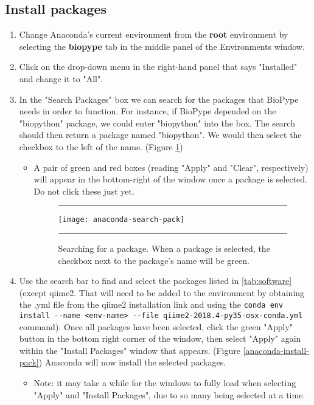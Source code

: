 \subsection*{Install packages}
    \begin{enumerate}
        \item Change Anaconda's current environment from the \textbf{root} environment by selecting the \textbf{biopype} tab in the middle panel of the Environments window.
        \item Click on the drop-down menu in the right-hand panel that says "Installed" and change it to "All".
        \item In the "Search Packages" box we can search for the packages that BioPype needs in order to function. For instance, if BioPype depended on the "biopython" package, we could enter "biopython" into the box. The search should then return a package named "biopython". We would then select the checkbox to the left of the name. (Figure \ref{anaconda-search-pack})
        \begin{itemize}
            \item A pair of green and red boxes (reading "Apply" and "Clear", respectively) will appear in the bottom-right of the window once a package is selected. Do not click these just yet. 

\begin{figure}[hbtp]
    \begin{maxipage}
    \hrule
    \centering
    \texttt{[image: anaconda-search-pack]}
    \caption{Searching for a package. When a package is selected, the checkbox next to the package's name will be green.}
    \label{anaconda-search-pack}
    \hrule
    \end{maxipage}
\end{figure}
        \end{itemize}
        \item Use the search bar to find and select the packages listed in \autoref{tab:software} (except qiime2. That will need to be added to the environment by obtaining the .yml file from the qiime2 installation link and using the \verb|conda env install --name <env-name> --file qiime2-2018.4-py35-osx-conda.yml| command). Once all packages have been selected, click the green "Apply" button in the bottom right corner of the window, then select "Apply" again within the "Install Packages" window that appears. (Figure \ref{anaconda-install-pack}) Anaconda will now install the selected packages.
        \begin{itemize}
        \item Note: it may take a while for the windows to fully load when selecting "Apply" and "Install Packages", due to so many being selected at a time. 
        \end{itemize}


\end{enumerate}
